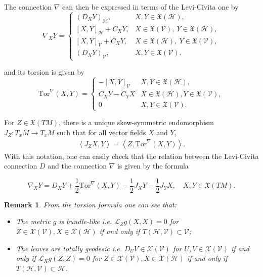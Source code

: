 \documentclass[11pt]{article}
\numberwithin{equation}{section}
\newtheorem{remark}[theorem]{Remark}
\newcommand{\Ho}{\mathcal H}
\newcommand{\V}{\mathcal V}
\newcommand{\Tor}{\mathrm{Tor}}
\begin{document}
The connection $\nabla$ can then be expressed in terms of the Levi-Civita one  by
\[
	\nabla_X Y =
	\begin{cases}
		( D_X Y)_{\mathcal{H}} , &X,Y \in \mathfrak{X}(\mathcal{H}), \\
		[X,Y]_{\mathcal{H}}+C_X Y,  &X \in \mathfrak{X}(\mathcal{V}),\ Y \in \mathfrak{X}(\mathcal{H}), \\
		[X,Y]_{\mathcal{V}}+C_X Y,  &X \in \mathfrak{X}(\mathcal{H}),\ Y \in \mathfrak{X}(\mathcal{V}), \\
		(D_X Y)_{\mathcal{V}} , &X,Y \in \mathfrak{X}(\mathcal{V}).
	\end{cases}
	\]
    
and its torsion is given by
\begin{equation}\label{formula torsion}
\Tor^\nabla(X,Y) = \begin{cases}
- [X,Y]_\V & X,Y \in \mathfrak{X}(\mathcal{H}), \\
C_X Y - C_Y X &  X \in \mathfrak{X}(\mathcal{H}), Y \in \mathfrak{X}(\mathcal{V}), \\
0 & X,Y \in \mathfrak{X}(\mathcal{V}).
\end{cases}
\end{equation}

For $Z \in \mathfrak{X}(TM)$, there is a  unique skew-symmetric endomorphism  $J_Z:T_xM \to T_xM$ such that for all vector fields $X$ and $Y$,
\begin{align}\label{Jmap}
\left\langle J_Z X,Y\right\rangle= \left\langle Z,\Tor^\nabla (X,Y) \right\rangle.
\end{align}
With this notation, one can easily check that the relation between the Levi-Civita connection $D$  and the connection $\nabla$ is given by the formula

\begin{equation}\label{Levi-Civita}
\nabla_X Y=D_X Y+\frac{1}{2} \Tor^\nabla (X,Y)-\frac{1}{2} J_XY-\frac{1}{2} J_Y X, \quad X,Y \in \mathfrak{X}(TM).
\end{equation}


\begin{remark}\label{torsion characterization}
    From the torsion formula one can see that:
    \begin{itemize}
        \item The metric $g$ is bundle-like i.e. $\mathcal{L}_Z g (X,X)=0$ for  $Z \in \mathcal{X} (\V), X \in \mathcal{X}(\Ho)$ if and only if $T(\Ho,\V) \subset \V$;
        \item The leaves are totally geodesic i.e. $ D_U V \in \mathcal{X} (\V)$ for $U,V \in \mathcal{X} (\V)$ if and only if $\mathcal{L}_X g (Z,Z)=0$ for  $Z \in \mathcal{X} (\V), X \in \mathcal{X}(\Ho)$ if and only if $T(\Ho,\V) \subset \Ho$.
    \end{itemize}
\end{remark}
\end{document}
